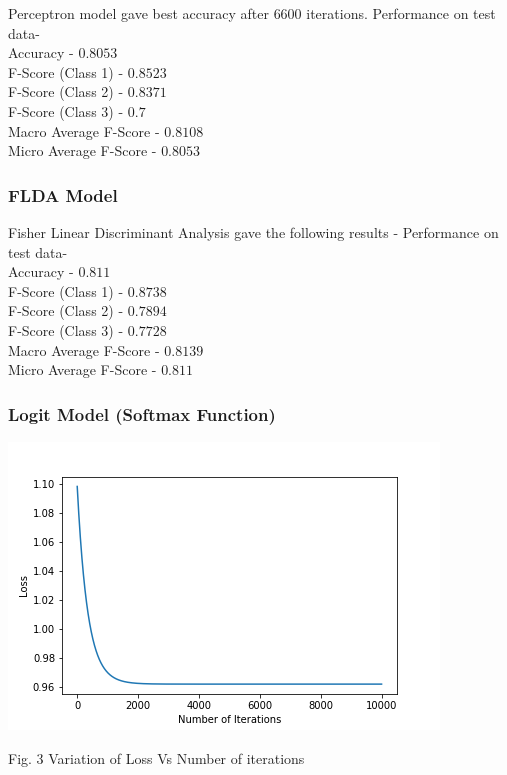 \documentclass[12pt,journal,compsoc]{IEEEtran}
\begin{document}
Perceptron model gave best accuracy after $6600$ iterations.
Performance on test data-\\ 
Accuracy - $0.8053$\\ F-Score (Class 1) - $0.8523$\\
F-Score (Class 2) - $0.8371$\\ F-Score (Class 3) - $0.7$\\ Macro Average F-Score - $0.8108$\\
Micro Average F-Score - $0.8053$\\

\subsubsection{FLDA Model}
\noindent Fisher Linear Discriminant Analysis gave the following results -
Performance on test data-\\ 
Accuracy - $0.811$\\ F-Score (Class 1) - $0.8738$\\
F-Score (Class 2) - $0.7894$\\ F-Score (Class 3) - $0.7728$\\ Macro Average F-Score - $0.8139$\\
Micro Average F-Score - $0.811$\\

\subsubsection{Logit Model (Softmax Function)}
\begin{center}
\includegraphics[scale=0.35]{softmaxloss.png}

{\small Fig. 3 Variation of Loss Vs Number of iterations}
\end{center}
\end{document}
